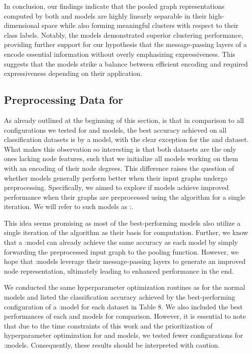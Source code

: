 In conclusion, our findings indicate that the pooled graph representations computed by both \wlnn and \gnn models are highly linearly separable in their high-dimensional space while also forming meaningful clusters with respect to their class labels. Notably, the \gnn models demonstrated superior clustering performance, providing further support for our hypothesis that the message-passing layers of a \gnn encode essential information without overly emphasizing expressiveness. This suggests that the \gnn models strike a balance between efficient encoding and required expressiveness depending on their application.

\FloatBarrier
\subsection{Preprocessing Data for \gnns}
As already outlined at the beginning of this section, is that in comparison to all configurations we tested for \wlnn and \gnn models, the best accuracy achieved on all classification datasets is by a \wlnn model, with the clear exception for the \imdb and \reddit dataset. What makes this observation so interesting is that both datasets are the only ones lacking node features, such that we initialize all \gnn models working on them with an encoding of their node degrees. This difference raises the question of whether \gnn models generally perform better when their input graphs undergo preprocessing. Specifically, we aimed to explore if \gnn models achieve improved performance when their graphs are preprocessed using the \wl algorithm for a single iteration. We will refer to such \gnn models as \wl:\gnn.

This idea seems promising as most of the best-performing \wlnn models also utilize a single iteration of the \wl algorithm as their basis for computation. Further, we know that a \wl:\gnn model can already achieve the same accuracy as each \wlnn model by simply forwarding the preprocessed input graph to the pooling function. However, we hope that \wl:\gnn models leverage their message-passing layers to generate an improved node representation, ultimately leading to enhanced performance in the end.

We conducted the same hyperparameter optimization routines as for the normal \gnn models and listed the classification accuracy achieved by the best-performing configuration of a \wl:\gnn model for each dataset in Table 8. We also included the best performances of each \wlnn and \gnn models for comparison. However, it is essential to note that due to the time constraints of this work and the prioritization of hyperparameter optimization for \gnn and \wlnn models, we tested fewer configurations for \wl:\gnn models. Consequently, these results should be interpreted with caution.

